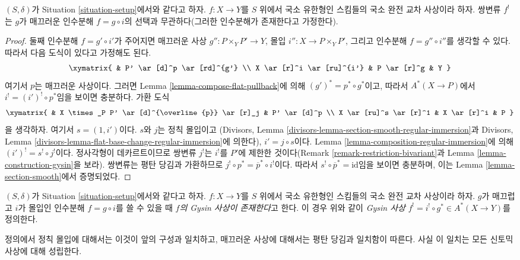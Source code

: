 \begin{lemma}
\label{lemma-lci-gysin-well-defined}
$(S, \delta)$가 Situation \ref{situation-setup}에서와 같다고 하자.
$f : X \to Y$를 $S$ 위에서 국소 유한형인 스킴들의 국소 완전 교차
사상이라 하자. 쌍변류 $f^!$는 $g$가 매끄러운 인수분해
$f = g \circ i$의 선택과 무관하다(그러한 인수분해가 존재한다고
가정한다).
\end{lemma}

\begin{proof}
둘째 인수분해 $f = g' \circ i'$가 주어지면 매끄러운 사상
$g'' : P \times_Y P' \to Y$, 몰입 $i'' : X \to P \times_Y P'$, 그리고
인수분해 $f = g'' \circ i''$를 생각할 수 있다. 따라서 다음 도식이
있다고 가정해도 된다.
$$
\xymatrix{
& P' \ar[d]^p \ar[rd]^{g'} \\
X \ar[r]^i \ar[ru]^{i'} & P \ar[r]^g & Y
}
$$
여기서 $p$는 매끄러운 사상이다. 그러면 Lemma
\ref{lemma-compose-flat-pullback}에 의해
$(g')^* = p^* \circ g^*$이고, 따라서 $A^*(X \to P)$에서
$i^! = (i')^! \circ p^*$임을 보이면 충분하다. 가환 도식
$$
\xymatrix{
& X \times_P P' \ar[d]^{\overline{p}} \ar[r]_j & P' \ar[d]^p \\
X \ar[ru]^s \ar[r]^1 & X \ar[r]^i & P
}
$$
을 생각하자. 여기서 $s =(1, i')$이다. $s$와 $j$는 정칙 몰입이고
(Divisors, Lemma \ref{divisors-lemma-section-smooth-regular-immersion}과
Divisors, Lemma \ref{divisors-lemma-flat-base-change-regular-immersion}에
의한다), $i' = j \circ s$이다. Lemma
\ref{lemma-composition-regular-immersion}에 의해
$(i')^! = s^! \circ j^!$이다. 정사각형이 데카르트이므로 쌍변류
$j^!$는 $i^!$를 $P'$에 제한한 것이다(Remark
\ref{remark-restriction-bivariant}과 Lemma
\ref{lemma-construction-gysin}을 보라). 쌍변류는 평탄 당김과
가환하므로 $j^! \circ p^* = \overline{p}^* \circ i^!$이다. 따라서
$s^! \circ \overline{p}^* = \text{id}$임을 보이면 충분하며, 이는
Lemma \ref{lemma-section-smooth}에서 증명되었다.
\end{proof}

\begin{definition}
\label{definition-lci-gysin}
$(S, \delta)$가 Situation \ref{situation-setup}에서와 같다고 하자.
$f : X \to Y$를 $S$ 위에서 국소 유한형인 스킴들의 국소 완전 교차
사상이라 하자. $g$가 매끄럽고 $i$가 몰입인 인수분해
$f = g \circ i$를 쓸 수 있을 때 {\it $f$의 Gysin 사상이 존재한다}고
한다. 이 경우 위와 같이 {\it Gysin 사상}
$f^! = i^! \circ g^* \in A^*(X \to Y)$를 정의한다.
\end{definition}

\noindent
정의에서 정칙 몰입에 대해서는 이것이 앞의 구성과 일치하고,
매끄러운 사상에 대해서는 평탄 당김과 일치함이 따른다. 사실 이
일치는 모든 신토믹 사상에 대해 성립한다.

